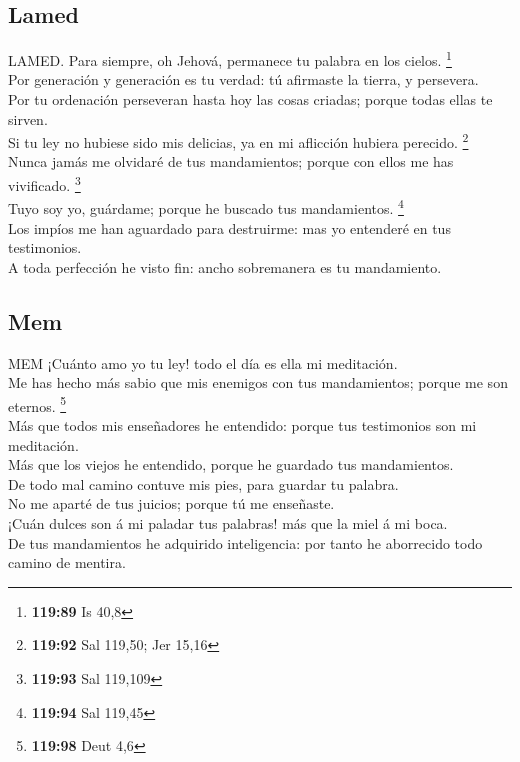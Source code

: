 \hypertarget{lamed}{%
\subsection{Lamed}\label{lamed}}

 LAMED. Para siempre, oh Jehová, permanece tu palabra en
los cielos. \footnote{\textbf{119:89} Is 40,8}\\
 Por generación y generación es tu verdad: tú afirmaste
la tierra, y persevera.\\
 Por tu ordenación perseveran hasta hoy las cosas
criadas; porque todas ellas te sirven.\\
 Si tu ley no hubiese sido mis delicias, ya en mi
aflicción hubiera perecido. \footnote{\textbf{119:92} Sal 119,50; Jer
  15,16}\\
 Nunca jamás me olvidaré de tus mandamientos; porque con
ellos me has vivificado. \footnote{\textbf{119:93} Sal 119,109}\\
 Tuyo soy yo, guárdame; porque he buscado tus
mandamientos. \footnote{\textbf{119:94} Sal 119,45}\\
 Los impíos me han aguardado para destruirme: mas yo
entenderé en tus testimonios.\\
 A toda perfección he visto fin: ancho sobremanera es tu
mandamiento.

\hypertarget{mem}{%
\subsection{Mem}\label{mem}}

 MEM ¡Cuánto amo yo tu ley! todo el día es ella mi
meditación.\\
 Me has hecho más sabio que mis enemigos con tus
mandamientos; porque me son eternos. \footnote{\textbf{119:98} Deut 4,6}\\
 Más que todos mis enseñadores he entendido: porque tus
testimonios son mi meditación.\\
 Más que los viejos he entendido, porque he guardado tus
mandamientos.\\
 De todo mal camino contuve mis pies, para guardar tu
palabra.\\
 No me aparté de tus juicios; porque tú me enseñaste.\\
 ¡Cuán dulces son á mi paladar tus palabras! más que la
miel á mi boca.\\
 De tus mandamientos he adquirido inteligencia: por
tanto he aborrecido todo camino de mentira.


